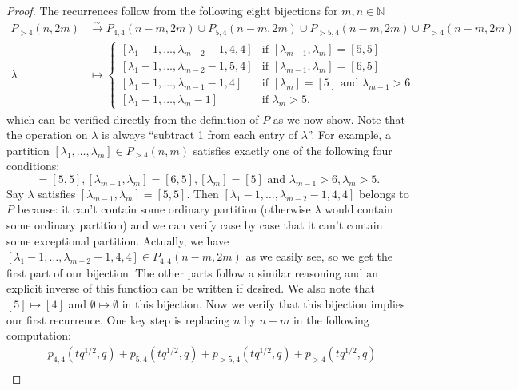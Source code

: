\documentclass[12pt, reqno]{amsart}
\theoremstyle{remark}
\begin{document}
\begin{proof}
  The recurrences follow from the following eight bijections for $m, n \in \mathbb{N}$
  \begin{align*}
    P_{>4}(n, 2m) &\xrightarrow{\sim} P_{4, 4}(n - m, 2m) \cup P_{5, 4}(n - m, 2m) \cup P_{>5, 4}(n - m, 2m) \cup P_{>4}(n - m, 2m) \\
    \lambda &\mapsto
              \begin{cases}
                [\lambda_1 - 1, \dots, \lambda_{m - 2} - 1, 4, 4] &\text{if }[\lambda_{m - 1}, \lambda_m] = [5, 5] \\
                [\lambda_1 - 1, \dots, \lambda_{m - 2} - 1, 5, 4] &\text{if }[\lambda_{m - 1}, \lambda_m] = [6, 5] \\
                [\lambda_1 - 1, \dots, \lambda_{m - 1} - 1, 4] &\text{if }[\lambda_m] = [5]\text{ and }\lambda_{m - 1} > 6 \\
                [\lambda_1 - 1, \dots, \lambda_m - 1] &\text{if }\lambda_m > 5,
              \end{cases}
  \end{align*}
  which can be verified directly from the definition of $P$ as we now show.
  Note that the operation on $\lambda$ is always ``subtract 1 from each entry of $\lambda$''.
  For example, a partition $[\lambda_1, \dots, \lambda_m] \in P_{>4}(n, m)$ satisfies exactly one of the following four conditions:
  \begin{equation*}
    [\lambda_{m - 1}, \lambda_m] = [5, 5], [\lambda_{m - 1}, \lambda_m] = [6, 5], [\lambda_m] = [5]\text{ and }\lambda_{m - 1} > 6, \lambda_m > 5.
  \end{equation*}
  Say $\lambda$ satisfies $[\lambda_{m - 1}, \lambda_m] = [5, 5]$.
  Then $[\lambda_1 - 1, \dots, \lambda_{m - 2} - 1, 4, 4]$ belongs to $P$ because: it can't contain some ordinary partition (otherwise $\lambda$ would contain some ordinary partition) and we can verify case by case that it can't contain some exceptional partition.
  Actually, we have $[\lambda_1 - 1, \dots, \lambda_{m - 2} - 1, 4, 4] \in P_{4, 4}(n - m, 2m)$ as we easily see, so we get the first part of our bijection.
  The other parts follow a similar reasoning and an explicit inverse of this function can be written if desired.
  We also note that $[5] \mapsto [4]$ and $\emptyset \mapsto \emptyset$ in this bijection.
  Now we verify that this bijection implies our first recurrence.
  One key step is replacing $n$ by $n - m$ in the following computation:
  \begin{align*}
    &p_{4, 4}(tq^{1/2}, q) + p_{5, 4}(tq^{1/2}, q) + p_{>5, 4}(tq^{1/2}, q) + p_{>4}(tq^{1/2}, q) \\

\end{align*}
\end{proof}
\end{document}
